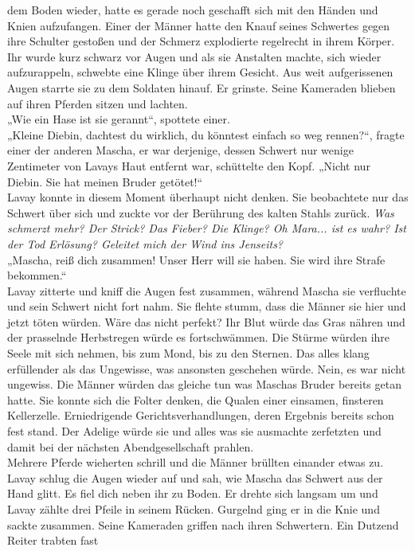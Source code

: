dem Boden wieder, hatte es gerade noch geschafft sich mit den Händen und Knien aufzufangen. Einer 
der Männer hatte den Knauf seines Schwertes gegen ihre Schulter gestoßen und der Schmerz 
explodierte regelrecht in ihrem Körper. Ihr wurde kurz schwarz vor Augen und als sie Anstalten 
machte, sich wieder aufzurappeln, schwebte eine Klinge über ihrem Gesicht. Aus weit aufgerissenen 
Augen starrte sie zu dem Soldaten hinauf. Er grinste. Seine Kameraden blieben auf ihren Pferden 
sitzen und lachten. \\
„Wie ein Hase ist sie gerannt“, spottete einer. \\
„Kleine Diebin, dachtest du wirklich, du könntest einfach so weg rennen?“, fragte einer der anderen
Mascha, er war derjenige, dessen Schwert nur wenige Zentimeter von Lavays Haut entfernt war, 
schüttelte den Kopf. „Nicht nur Diebin. Sie hat meinen Bruder getötet!“\\
Lavay konnte in diesem Moment überhaupt nicht denken. Sie beobachtete nur das Schwert über sich und 
zuckte vor der Berührung des kalten Stahls zurück. \textit{Was schmerzt mehr? Der Strick? Das 
Fieber? Die Klinge? Oh Mara... ist es wahr? Ist der Tod Erlösung? Geleitet mich der Wind ins 
Jenseits?}\\
„Mascha, reiß dich zusammen! Unser Herr will sie haben. Sie wird ihre Strafe bekommen.“\\
Lavay zitterte und kniff die Augen fest zusammen, während Mascha sie verfluchte und sein Schwert 
nicht fort nahm. Sie flehte stumm, dass die Männer sie hier und jetzt töten würden. Wäre das nicht 
perfekt? Ihr Blut würde das Gras nähren und der prasselnde Herbstregen würde es fortschwämmen. Die 
Stürme würden ihre Seele mit sich nehmen, bis zum Mond, bis zu den Sternen. Das alles klang 
erfüllender als das Ungewisse, was ansonsten geschehen würde. Nein, es war nicht ungewiss. Die 
Männer würden das gleiche tun was Maschas Bruder bereits getan hatte. Sie konnte sich die Folter 
denken, die Qualen einer einsamen, finsteren Kellerzelle. Erniedrigende Gerichtsverhandlungen, 
deren Ergebnis bereits schon fest stand. Der Adelige würde sie und alles was sie ausmachte 
zerfetzten und damit bei der nächsten Abendgesellschaft prahlen.\\
Mehrere Pferde wieherten schrill und die Männer brüllten einander etwas zu. Lavay schlug die Augen 
wieder auf und sah, wie Mascha das Schwert aus der Hand glitt. Es fiel dich neben ihr zu Boden. Er 
drehte sich langsam um und Lavay zählte drei Pfeile in seinem Rücken. Gurgelnd ging er in die Knie 
und sackte zusammen. Seine Kameraden griffen nach ihren Schwertern. Ein Dutzend Reiter trabten fast 
